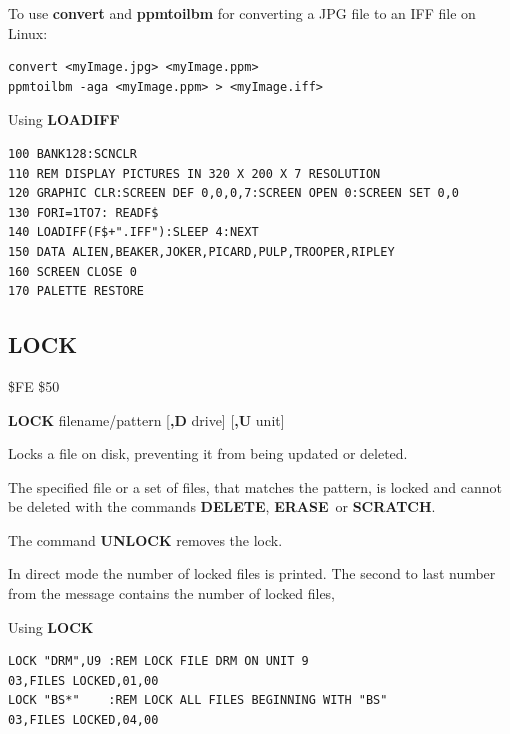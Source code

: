 \begin{description}[leftmargin=2cm,style=nextline]
To use {\bf convert} and {\bf ppmtoilbm} for converting a JPG file to an IFF file on Linux:

\begin{verbatim}
convert <myImage.jpg> <myImage.ppm>
ppmtoilbm -aga <myImage.ppm> > <myImage.iff>
\end{verbatim}

\item [Example:] Using {\bf LOADIFF}
\begin{tcolorbox}[colback=black,coltext=white]
\verbatimfont{\codefont}
\begin{verbatim}
100 BANK128:SCNCLR
110 REM DISPLAY PICTURES IN 320 X 200 X 7 RESOLUTION
120 GRAPHIC CLR:SCREEN DEF 0,0,0,7:SCREEN OPEN 0:SCREEN SET 0,0
130 FORI=1TO7: READF$
140 LOADIFF(F$+".IFF"):SLEEP 4:NEXT
150 DATA ALIEN,BEAKER,JOKER,PICARD,PULP,TROOPER,RIPLEY
160 SCREEN CLOSE 0
170 PALETTE RESTORE
\end{verbatim}
\end{tcolorbox}
\end{description}


\newpage
\subsection{LOCK}
\begin{description}[leftmargin=2cm,style=nextline]
\item [Token:] \$FE \$50
\item [Format:] {\bf LOCK} filename/pattern [{\bf,D} drive] [{\bf,U} unit]
\item [Usage:] Locks a file on disk, preventing it from being updated or deleted.

               The specified file or
               a set of files, that matches the pattern, is locked
               and cannot be deleted with the commands {\bf DELETE},
               {\bf ERASE} or {\bf SCRATCH}.

               The command {\bf UNLOCK} removes the lock.

   \filenamedefinition

   \drivedefinition

   \unitdefinition

\item [Remarks:]

   In direct mode the number of locked files is printed.
                 The second to last number from the message
                 contains the number of locked files,

\item [Examples:] Using {\bf LOCK}
\begin{tcolorbox}[colback=black,coltext=white]
\verbatimfont{\codefont}
\begin{verbatim}
LOCK "DRM",U9 :REM LOCK FILE DRM ON UNIT 9
03,FILES LOCKED,01,00
LOCK "BS*"    :REM LOCK ALL FILES BEGINNING WITH "BS"
03,FILES LOCKED,04,00
\end{verbatim}
\end{tcolorbox}
\end{description}

